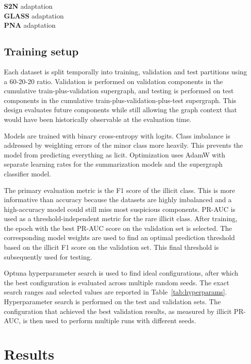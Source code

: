 \documentclass[12pt, twocolumn]{report}
\begin{document}
\noindent
\textbf{S2N} adaptation \\

\noindent
\textbf{GLASS} adaptation \\

\noindent
\textbf{PNA} adaptation \\

\section{Training setup}

Each dataset is split temporally into training, validation and test partitions using a 60-20-20 ratio. Validation is performed on validation components in the cumulative train-plus-validation supergraph, and testing is performed on test components in the cumulative train-plus-validation-plus-test supergraph. This design evaluates future components while still allowing the graph context that would have been historically observable at the evaluation time.

Models are trained with binary cross-entropy with logits. Class imbalance is addressed by weighting errors of the minor class more heavily. This prevents the model from predicting everything as licit. Optimization uses AdamW with separate learning rates for the summarization models and the supergraph classifier model. 

The primary evaluation metric is the F1 score of the illicit class. This is more informative than accuracy because the datasets are highly imbalanced and a high-accuracy model could still miss most suspicious components. PR-AUC is used as a threshold-independent metric for the rare illicit class. After training, the epoch with the best PR-AUC score on the validation set is selected. The corresponding model weights are used to find an optimal prediction threshold based on the illicit F1 score on the validation set. This final threshold is subsequently used for testing.

Optuna hyperparameter search is used to find ideal configurations, after which the best configuration is evaluated across multiple random seeds. The exact search ranges and selected values are reported in Table~\ref{tab:hyperparams}. Hyperparameter search is performed on the test and validation sets. The configuration that achieved the best validation results, as measured by illicit PR-AUC, is then used to perform multiple runs with different seeds.


\chapter{Results}
\end{document}
